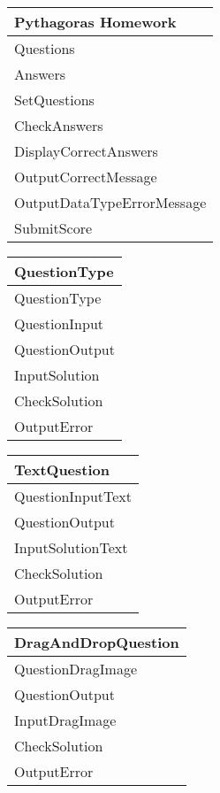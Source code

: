 \begin{center}
\begin{tabular}{|p{5cm}|} \hline
Pythagoras Homework \\ \hline
Questions \\
Answers \\ \hline
SetQuestions \\
CheckAnswers \\
DisplayCorrectAnswers \\
OutputCorrectMessage \\
OutputDataTypeErrorMessage \\
SubmitScore \\ \hline
\end{tabular}
\end{center}

\begin{center}
\begin{tabular}{|p{5cm}|} \hline
QuestionType \\ \hline
QuestionType \\
QuestionInput \\
QuestionOutput \\ \hline
InputSolution \\
CheckSolution \\
OutputError \\ \hline
\end{tabular}
\end{center}

\begin{center}
\begin{tabular}{|p{5cm}|} \hline
TextQuestion \\ \hline
QuestionInputText \\ 
QuestionOutput \\ \hline
InputSolutionText \\ 
CheckSolution \\
OutputError \\ \hline
\end{tabular}
\end{center}

\begin{center}
\begin{tabular}{|p{5cm}|} \hline
DragAndDropQuestion \\ \hline
QuestionDragImage \\ 
QuestionOutput \\ \hline
InputDragImage \\ 
CheckSolution \\
OutputError \\ \hline
\end{tabular}
\end{center}

